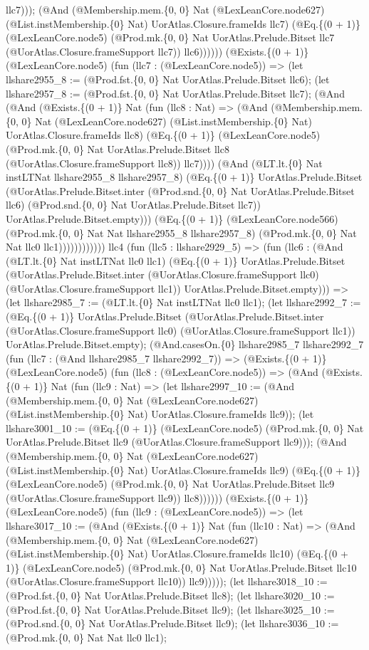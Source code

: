 \documentclass[11pt]{article}
\begin{document}
llc7))); (@And (@Membership.mem.\{0, 0\} Nat (@LexLeanCore.node627) (@List.instMembership.\{0\} Nat) UorAtlas.Closure.frameIds llc7) (@Eq.\{(0 + 1)\} (@LexLeanCore.node5) (@Prod.mk.\{0, 0\} Nat UorAtlas.Prelude.Bitset llc7 (@UorAtlas.Closure.frameSupport llc7)) llc6)))))) (@Exists.\{(0 + 1)\} (@LexLeanCore.node5) (fun (llc7 : (@LexLeanCore.node5)) => (let llshare2955\_8 := (@Prod.fst.\{0, 0\} Nat UorAtlas.Prelude.Bitset llc6); (let llshare2957\_8 := (@Prod.fst.\{0, 0\} Nat UorAtlas.Prelude.Bitset llc7); (@And (@And (@Exists.\{(0 + 1)\} Nat (fun (llc8 : Nat) => (@And (@Membership.mem.\{0, 0\} Nat (@LexLeanCore.node627) (@List.instMembership.\{0\} Nat) UorAtlas.Closure.frameIds llc8) (@Eq.\{(0 + 1)\} (@LexLeanCore.node5) (@Prod.mk.\{0, 0\} Nat UorAtlas.Prelude.Bitset llc8 (@UorAtlas.Closure.frameSupport llc8)) llc7)))) (@And (@LT.lt.\{0\} Nat instLTNat llshare2955\_8 llshare2957\_8) (@Eq.\{(0 + 1)\} UorAtlas.Prelude.Bitset (@UorAtlas.Prelude.Bitset.inter (@Prod.snd.\{0, 0\} Nat UorAtlas.Prelude.Bitset llc6) (@Prod.snd.\{0, 0\} Nat UorAtlas.Prelude.Bitset llc7)) UorAtlas.Prelude.Bitset.empty))) (@Eq.\{(0 + 1)\} (@LexLeanCore.node566) (@Prod.mk.\{0, 0\} Nat Nat llshare2955\_8 llshare2957\_8) (@Prod.mk.\{0, 0\} Nat Nat llc0 llc1)))))))))))) llc4 (fun (llc5 : llshare2929\_5) => (fun (llc6 : (@And (@LT.lt.\{0\} Nat instLTNat llc0 llc1) (@Eq.\{(0 + 1)\} UorAtlas.Prelude.Bitset (@UorAtlas.Prelude.Bitset.inter (@UorAtlas.Closure.frameSupport llc0) (@UorAtlas.Closure.frameSupport llc1)) UorAtlas.Prelude.Bitset.empty))) => (let llshare2985\_7 := (@LT.lt.\{0\} Nat instLTNat llc0 llc1); (let llshare2992\_7 := (@Eq.\{(0 + 1)\} UorAtlas.Prelude.Bitset (@UorAtlas.Prelude.Bitset.inter (@UorAtlas.Closure.frameSupport llc0) (@UorAtlas.Closure.frameSupport llc1)) UorAtlas.Prelude.Bitset.empty); (@And.casesOn.\{0\} llshare2985\_7 llshare2992\_7 (fun (llc7 : (@And llshare2985\_7 llshare2992\_7)) => (@Exists.\{(0 + 1)\} (@LexLeanCore.node5) (fun (llc8 : (@LexLeanCore.node5)) => (@And (@Exists.\{(0 + 1)\} Nat (fun (llc9 : Nat) => (let llshare2997\_10 := (@And (@Membership.mem.\{0, 0\} Nat (@LexLeanCore.node627) (@List.instMembership.\{0\} Nat) UorAtlas.Closure.frameIds llc9)); (let llshare3001\_10 := (@Eq.\{(0 + 1)\} (@LexLeanCore.node5) (@Prod.mk.\{0, 0\} Nat UorAtlas.Prelude.Bitset llc9 (@UorAtlas.Closure.frameSupport llc9))); (@And (@Membership.mem.\{0, 0\} Nat (@LexLeanCore.node627) (@List.instMembership.\{0\} Nat) UorAtlas.Closure.frameIds llc9) (@Eq.\{(0 + 1)\} (@LexLeanCore.node5) (@Prod.mk.\{0, 0\} Nat UorAtlas.Prelude.Bitset llc9 (@UorAtlas.Closure.frameSupport llc9)) llc8)))))) (@Exists.\{(0 + 1)\} (@LexLeanCore.node5) (fun (llc9 : (@LexLeanCore.node5)) => (let llshare3017\_10 := (@And (@Exists.\{(0 + 1)\} Nat (fun (llc10 : Nat) => (@And (@Membership.mem.\{0, 0\} Nat (@LexLeanCore.node627) (@List.instMembership.\{0\} Nat) UorAtlas.Closure.frameIds llc10) (@Eq.\{(0 + 1)\} (@LexLeanCore.node5) (@Prod.mk.\{0, 0\} Nat UorAtlas.Prelude.Bitset llc10 (@UorAtlas.Closure.frameSupport llc10)) llc9))))); (let llshare3018\_10 := (@Prod.fst.\{0, 0\} Nat UorAtlas.Prelude.Bitset llc8); (let llshare3020\_10 := (@Prod.fst.\{0, 0\} Nat UorAtlas.Prelude.Bitset llc9); (let llshare3025\_10 := (@Prod.snd.\{0, 0\} Nat UorAtlas.Prelude.Bitset llc9); (let llshare3036\_10 := (@Prod.mk.\{0, 0\} Nat Nat llc0 llc1); 
\end{document}
